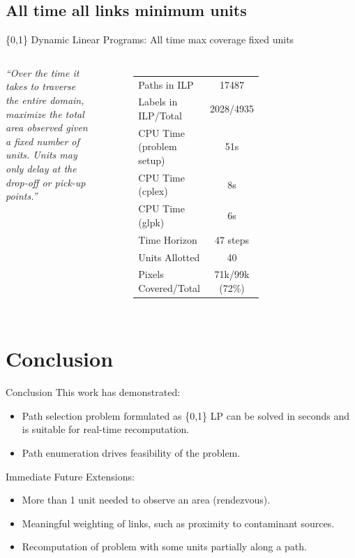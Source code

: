 \documentclass[xcolor=pdflatex,dvipsnames,table]{beamer}
\begin{document}
\subsection{All time all links minimum units}
\begin{frame}{\{0,1\} Dynamic Linear Programs: All time max coverage fixed units}
\begin{columns}

  \emph{``Over the time it takes to traverse the entire domain, maximize the total area observed given a fixed number of units. Units may only delay at the drop-off or pick-up points.''}
  \begin{figure}
    \begin{tabular}{|l|c|}
    \hline 
    Paths in ILP & 17487 \\
    Labels in ILP/Total & 2028/4935 \\
    CPU Time (problem setup) & 51s \\
    CPU Time (cplex) & 8s \\
    CPU Time (glpk) & 6s \\
    Time Horizon & 47 steps\\
    Units Allotted & 40\\
    Pixels Covered/Total & 71k/99k (72\%)\\
    \hline
    \end{tabular}
  \end{figure}


  \begin{figure}
    \centering
    \hfill
  \end{figure}
\end{columns}
\end{frame}


\section{Conclusion}
\begin{frame}{Conclusion}
This work has demonstrated:
 \begin{itemize}
  \small
  \item Path selection problem formulated as \{0,1\} LP can be solved in seconds and is suitable for real-time recomputation.
  \item Path enumeration drives feasibility of the problem.
 \end{itemize}
Immediate Future Extensions:
 \begin{itemize}
  \small
  \item More than 1 unit needed to observe an area (rendezvous).
  \item Meaningful weighting of links, such as proximity to contaminant sources.
  \item Recomputation of problem with some units partially along a path.
 \end{itemize}
\end{frame}
\end{document}
